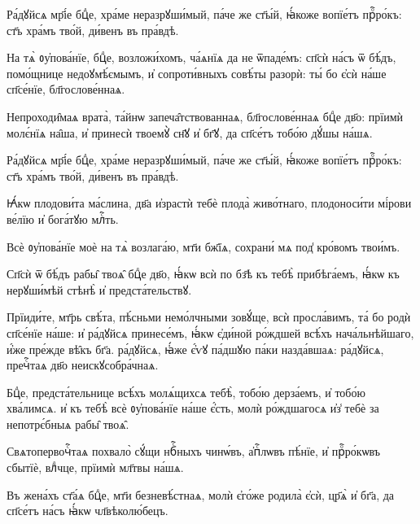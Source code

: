 \hKv Ра́дꙋйсѧ мр҃і́е бцⷣе, хра́ме неразрꙋши́мый, па́че же  ст҃ы́й, ꙗ҆́коже вопїе́тъ прⷪ҇ро́къ: ст҃ъ хра́мъ тво́й,  ди́венъ въ пра́вдѣ. 
%

\hKv На тѧ̀ ᲂу҆пова́нїе, бцⷣе, возложи́хомъ, ча́ѧнїѧ да не  ѿпаде́мъ: сп҃сѝ на́съ ѿ бѣ́дъ, помо́щнице  недоꙋмѣ́ємымъ, и҆ сопроти́вныхъ совѣ́ты разорѝ: ты́ бо  є҆сѝ на́ше сп҃се́нїе, бл҃гослове́ннаѧ. 
%

\hKv Непроходи̑маѧ врата̀, та́йнѡ запеча̑тствованнаѧ,  бл҃гослове́ннаѧ бцⷣе дв҃о: прїимѝ молє́нїѧ на̑ша, и҆  принесѝ твоемꙋ̀ сн҃ꙋ и҆ бг҃ꙋ, да сп҃се́тъ тобо́ю дꙋ́шы  на́шѧ. 
%

\hKv Ра́дꙋйсѧ мр҃і́е бцⷣе, хра́ме неразрꙋши́мый, па́че же  ст҃ы́й, ꙗ҆́коже вопїе́тъ прⷪ҇ро́къ: ст҃ъ хра́мъ тво́й,  ди́венъ въ пра́вдѣ.  
%

\hKv Ꙗ҆́кѡ плодови́та ма́слина, дв҃а и҆зрастѝ тебѐ плода̀  живо́тнаго, плодоноси́ти мі́рови ве́лїю и҆ бога́тꙋю млⷭ҇ть. 
%

\hKv Всѐ ᲂу҆пова́нїе моѐ на тѧ̀ возлага́ю, мт҃и бж҃їѧ,  сохрани́ мѧ под̾ кро́вомъ твои́мъ. 
%

\hKv Сп҃сѝ ѿ бѣ́дъ рабы̑ твоѧ̑ бцⷣе дв҃о, ꙗ҆́кѡ всѝ по  бз҃ѣ къ тебѣ̀ прибѣга́емъ, ꙗ҆́кѡ къ нерꙋши́мѣй стѣнѣ̀  и҆ предста́тельствꙋ. 
%

\hKv Прїиди́те, мт҃рь свѣ́та, пѣ́сньми немо́лчными зовꙋ́ще,  всѝ просла́вимъ, та́ бо родѝ сп҃се́нїе на́ше: и҆ ра́дꙋйсѧ  принесе́мъ, ꙗ҆́кѡ є҆ди́ной ро́ждшей всѣ́хъ  нача́льнѣйшаго, и҆́же пре́жде вѣ̑къ бг҃а. ра́дꙋйсѧ, ꙗ҆́же  є҆́ѵꙋ па́дшꙋю па́ки назда́вшаѧ: ра́дꙋйсѧ, пречⷭ҇таѧ дв҃о  неискꙋсобра́чнаѧ.  
%

\hKv Бцⷣе, предста́тельнице всѣ́хъ молѧ́щихсѧ тебѣ̀, тобо́ю  дерза́емъ, и҆ тобо́ю хва́лимсѧ. и҆ къ тебѣ̀ всѐ  ᲂу҆пова́нїе на́ше є҆́сть, молѝ ро́ждшагосѧ и҆з̾ тебѐ за  непотрє́бныѧ рабы̑ твоѧ̑. 
%

\hKv Свѧтопервочⷭ҇таѧ похвало̀ сꙋ́щи нбⷭ҇ныхъ чинѡ́въ, а҆пⷭ҇лѡвъ  пѣ́нїе, и҆ прⷪ҇ро́кѡвъ сбытїѐ, влⷣчце, прїимѝ мл҃твы  на́шѧ. 
%

\hKv Въ жена́хъ ст҃а́ѧ бцⷣе, мт҃и безневѣ́стнаѧ, молѝ є҆го́же  родила̀ є҆сѝ, цр҃ѧ̀ и҆ бг҃а, да сп҃се́тъ на́съ ꙗ҆́кѡ  чл҃вѣколю́бецъ. 
%

